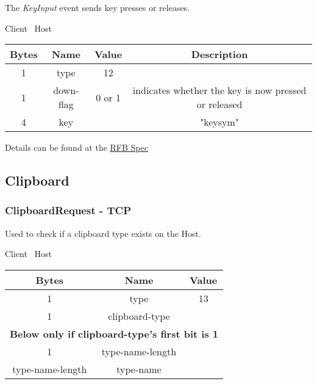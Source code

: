 The \emph{KeyInput} event sends key presses or releases.

\begin{center}
    Client \textrightarrow\ Host\\
    \begin{tabular}{|c|c|c|c|}
        \hline
        \textbf{Bytes} & \textbf{Name} & \textbf{Value} & \textbf{Description}                                 \\
        \hline
        1              & type          & 12              &                                                      \\
        \hline
        1              & down-flag     & 0 or 1         & indicates whether the key is now pressed or released \\
        \hline
        4              & key           &                & "keysym"                                             \\
        \hline
    \end{tabular}
\end{center}

Details can be found at the \href{https://github.com/rfbproto/rfbproto/blob/master/rfbproto.rst#keyevent}{RFB Spec}

\subsection{Clipboard}

\subsubsection{ClipboardRequest - TCP}

Used to check if a clipboard type exists on the Host.

\begin{center}
    Client \textrightarrow\ Host\\
    \begin{tabular}{|c|c|c|}
        \hline
        \textbf{Bytes}   & \textbf{Name}    & \textbf{Value} \\
        \hline
        1                & type             & 13             \\
        \hline
        1                & clipboard-type   &                \\
        \hline
        \multicolumn{3}{|c|}{\textbf{Below only if clipboard-type's first bit is 1} } \\
        \hline
        1                & type-name-length &                \\
        \hline
        type-name-length & type-name        &                \\
        \hline
    \end{tabular}
\end{center}

